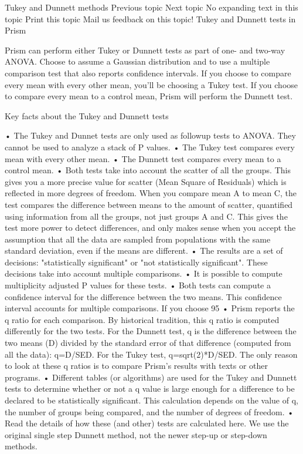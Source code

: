 Tukey and Dunnett methods
 Previous topic	Next topic	No expanding text in this topic	Print this topic	Mail us feedback on this topic!	 
Tukey and Dunnett tests in Prism

Prism can perform either Tukey or Dunnett tests as part of one- and two-way ANOVA. Choose to assume a Gaussian distribution and to use a multiple comparison test that also reports confidence intervals. If you choose to compare every mean with every other mean, you'll be choosing a Tukey test. If you choose to compare every mean to a control mean, Prism will perform the Dunnett test.

Key facts about the Tukey and Dunnett tests

•	The Tukey and Dunnet tests are only used as followup tests to ANOVA. They cannot be used to analyze a stack of P values.
•	The Tukey test compares every mean with every other mean.
•	The Dunnett test compares every mean to a control mean.
•	Both tests take into account the scatter of all the groups. This gives you a more precise value for scatter (Mean Square of Residuals) which is reflected in more degrees of freedom. When you compare mean A to mean C, the test compares the difference between means to the amount of scatter, quantified using information from all the groups, not just groups A and C. This gives the test more power to detect differences, and only makes sense when you accept the assumption that all the data are sampled from populations with the same standard deviation, even if the means are different.
•	The results are a set of decisions: "statistically significant" or "not statistically significant". These decisions take into account multiple comparisons.
•	It is possible to compute multiplicity adjusted P values for these tests.
•	Both tests can compute a confidence interval for the difference between the two means. This confidence interval accounts for multiple comparisons. If you choose 95%
•	Prism reports the q ratio for each comparison. By historical tradition, this q ratio is computed differently for the two tests. For the Dunnett test, q is the difference between the two means (D) divided by the standard error of that difference (computed from all the data): q=D/SED. For the Tukey test, q=sqrt(2)*D/SED. The only reason to look at these q ratios is to compare Prism's results with texts or other programs.
•	Different tables (or algorithms) are used for the Tukey and Dunnett tests to determine whether or not a q value is large enough for a difference to be declared to be statistically significant. This calculation depends on the value of q, the number of groups being compared, and the number of degrees of freedom.
•	Read the details of how these (and other) tests are calculated here. We use the original single step Dunnett method, not the newer step-up or step-down methods.
 
